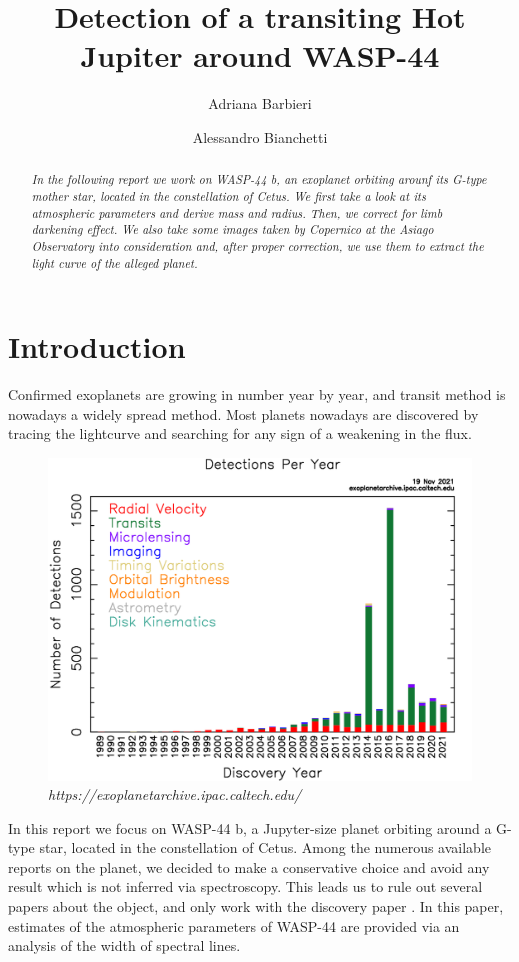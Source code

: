 \documentclass[a4paper,11pt,twocolumn]{article}
\title{Detection of a transiting Hot Jupiter around WASP-44}
\author{Adriana Barbieri \and Alessandro Bianchetti}
\begin{document}
\maketitle

\begin{abstract}

\emph{In the following report we work on WASP-44 b, an exoplanet orbiting 
arounf its G-type mother star, located in the constellation of Cetus. 
We first take a look at its atmospheric parameters and derive mass and 
radius. Then, we correct for limb darkening effect. We also take some 
images taken by Copernico at the Asiago Observatory into consideration and, 
after proper correction, we use them to extract the light curve of the 
alleged planet.}

\end{abstract}

\section{Introduction}

Confirmed exoplanets are growing in number year by year, and transit method 
is nowadays a widely spread method. Most planets nowadays are discovered 
by tracing the lightcurve and searching for any sign of a weakening in the 
flux.
\begin{figure}[H]
    \centering  
    \includegraphics[scale=0.15, angle=0]{../pictures/exo_dischist.png}
    \caption*{\textit{ https://exoplanetarchive.ipac.caltech.edu/}}
\end{figure}
In this report we focus on WASP-44 b, a Jupyter-size planet orbiting around 
a G-type star, located in the constellation of Cetus.
Among the numerous available reports on the planet, we decided to make a 
conservative choice and avoid any result which is not inferred via 
spectroscopy. This leads us to rule out several papers about the object, and 
only work with the discovery paper \cite*{Anderson}. In this paper, estimates 
of the atmospheric parameters of WASP-44 are provided via an analysis of 
the width of spectral lines.
\end{document}
